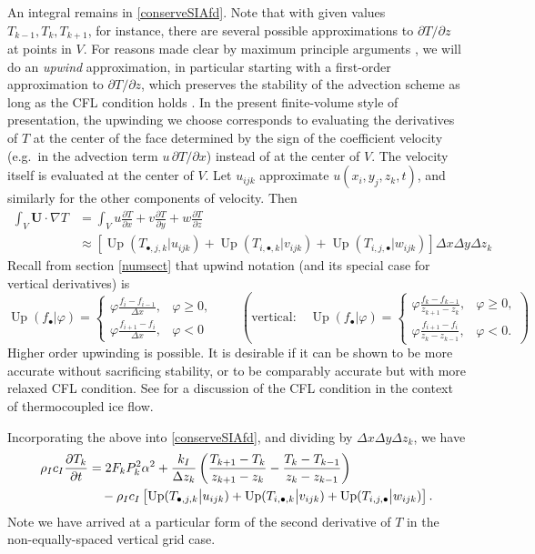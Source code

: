 \documentclass[12pt,final]{amsart}%
\theoremstyle{plain}
\theoremstyle{definition}
\theoremstyle{remark}
\newcommand{\ddt}[1]{\ensuremath{\frac{\partial #1}{\partial t}}}
\newcommand{\ddx}[1]{\ensuremath{\frac{\partial #1}{\partial x}}}
\newcommand{\ddy}[1]{\ensuremath{\frac{\partial #1}{\partial y}}}
\newcommand{\ddz}[1]{\ensuremath{\frac{\partial #1}{\partial z}}}
\newcommand{\grad}{\nabla}
\newcommand{\Up}{\ensuremath{\operatorname{Up}}}
\def\vf{\varphi}
\newcommand{\bU}{{\mathbf{U}}}
\begin{document}
An integral remains in \eqref{conserveSIAfd}.  Note that with given values $T_{k-1},T_k,T_{k+1}$, for instance, there are several possible approximations to $\partial T/\partial z$ at points in $V$.  For reasons made clear by maximum principle arguments \citep[especially section 4.3]{MortonMayers}, we will do an \emph{upwind} approximation, in particular starting with a first-order approximation to $\partial T/\partial z$, which preserves the stability of the advection scheme as long as the CFL condition holds \citep[section 4.2]{MortonMayers}.  In the present finite-volume style of presentation, the upwinding we choose corresponds to evaluating the derivatives of $T$ at the center of the face determined by the sign of the coefficient velocity (e.g.~in the advection term $u\,\partial T/\partial x$) instead of at the center of $V$.  The velocity itself is evaluated at the center of $V$.  Let $u_{ijk}$ approximate $u(x_i,y_j,z_k,t)$, and similarly for the other components of velocity.  Then
\begin{align*}
\int_V \bU \cdot \grad T &= \int_V u \ddx{T} + v \ddy{T} + w \ddz{T}\\
    &\approx \left[\Up(T_{\bullet,j,k} \big|u_{ijk}) + \Up(T_{i,\bullet,k} \big|v_{ijk}) + \Up(T_{i,j,\bullet} \big|w_{ijk})\right] \Delta x \Delta y \Delta z_k
\end{align*}
Recall from section \ref{numsect} that upwind notation (and its special case for vertical derivatives) is
    $$\Up(f_\bullet\big|\vf) = \begin{cases} \vf\frac{f_i-f_{i-1}}{\Delta x}, & \vf\ge 0, \\ \vf\frac{f_{i+1}-f_i}{\Delta x}, & \vf< 0\end{cases} \qquad \left(\text{vertical:} \quad \Up(f_\bullet\big|\vf) = \begin{cases} \vf\frac{f_k-f_{k-1}}{z_{k+1}-z_k}, & \vf\ge 0, \\ \vf\frac{f_{i+1}-f_i}{z_k-z_{k-1}}, & \vf< 0.\end{cases}\right)$$
Higher order upwinding \citep{PayneDongelmans} is possible.  It is desirable if it can be shown to be more accurate without sacrificing stability, or to be comparably accurate but with more relaxed CFL condition.  See \citep{BBL} for a discussion of the CFL condition in the context of thermocoupled ice flow.

Incorporating the above into \eqref{conserveSIAfd}, and dividing by $\Delta x\Delta y\Delta z_k$, we have
\begin{align}
\rho_I c_I \ddt{T_k} &= 2 F_k P_k^2 \alpha^2 + \frac{k_I}{\Delta z_k} \left(\frac{T_{k+1}-T_k}{z_{k+1}-z_k} - \frac{T_k-T_{k-1}}{z_k-z_{k-1}}\right) \label{temperatureSIAfd}\\
    &\quad - \rho_I c_I \left[\Up(T_{\bullet,j,k} \big|u_{ijk}) + \Up(T_{i,\bullet,k} \big|v_{ijk}) + \Up(T_{i,j,\bullet} \big|w_{ijk})\right]. \notag
\end{align}
Note we have arrived at a particular form of the second derivative of $T$ in the non-equally-spaced vertical grid case.
\end{document}
